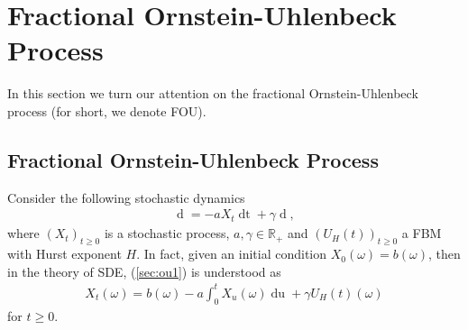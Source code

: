 \documentclass[a4paper, twoside, 11pt]{article}
\theoremstyle{definition}
\newtheorem{definition}{\scshape Definition}[section]
\newtheorem{theorem}[definition]{\scshape Theorem}
\begin{document}



\newpage
\section{Fractional Ornstein-Uhlenbeck Process}
\setcounter{equation}{0}
In this section we turn our attention on the fractional Ornstein-Uhlenbeck process (for short, we denote FOU). 
\subsection{Fractional Ornstein-Uhlenbeck Process}
Consider the following stochastic dynamics
\begin{eqnarray}
 \mathop{dX_t} = -aX_t\mathop{dt} + \gamma \mathop{dU_H(t)},
 \label{sec:ou1}
\end{eqnarray}
where $(X_t)_{t\ge 0}$ is a stochastic process, $a, \gamma\in\mathbb{R}_{+}$ and $(U_H(t))_{t\ge 0} $ a FBM with Hurst exponent $H$. In fact, given an initial condition $X_0(\omega)=b(\omega)$, then in the theory of SDE, (\ref{sec:ou1}) is understood as
\begin{eqnarray}
  X_t(\omega) = b(\omega) - a\int_0^t X_u(\omega) \mathop{du} + \gamma U_H(t)(\omega)
  \label{sec:oup}
\end{eqnarray}
for $t \ge 0$.
\end{document}
